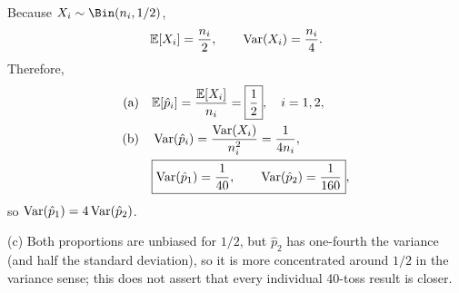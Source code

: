 \documentclass[11pt,oneside]{article}
\begin{document}
\begin{solution}
Because $X_i\sim\Bin(n_i,1/2)$,
\[
\mathbb{E}[X_i]=\frac{n_i}{2},\qquad\operatorname{Var}(X_i)=\frac{n_i}{4}.
\]
Therefore,
\begin{align*}
\textup{(a)}\quad&\mathbb{E}[\hat p_i]=\frac{\mathbb{E}[X_i]}{n_i}=\boxed{\frac12},\quad i=1,2,\\
\textup{(b)}\quad&\operatorname{Var}(\hat p_i)=\frac{\operatorname{Var}(X_i)}{n_i^2}=\frac1{4n_i},\\
&\boxed{\operatorname{Var}(\hat p_1)=\frac1{40},\qquad \operatorname{Var}(\hat p_2)=\frac1{160}},
\end{align*}
so $\operatorname{Var}(\hat p_1)=4\operatorname{Var}(\hat p_2)$.\par\medskip
\noindent\textup{(c)} Both proportions are unbiased for $1/2$, but $\hat p_2$ has one-fourth the variance (and half the standard deviation), so it is more concentrated around $1/2$ in the variance sense; this does not assert that every individual 40-toss result is closer.
\end{solution}
\end{document}
